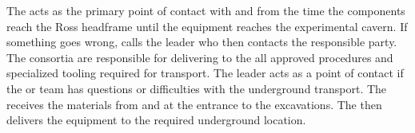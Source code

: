 The  acts as the primary point of contact with
 and \surf from the time the components reach the Ross
headframe until the equipment reaches the experimental cavern. If
something goes wrong, \surf calls the  leader who then
contacts the responsible party. The consortia are responsible for
delivering to the  all approved procedures and specialized
tooling required for transport. The  leader acts as a point
of contact if the  or \surf team has questions or difficulties
with the underground transport.  The  receives the
materials from  and \surf at the entrance to the 
excavations. The  then delivers the equipment to the
required underground location.

